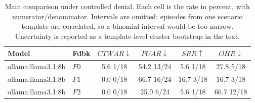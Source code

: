 \begin{table}[t]
\caption{
Main comparison under controlled denial. Each cell is the rate in percent, with numerator/denominator. Intervals are omitted: episodes from one scenario template are correlated, so a binomial interval would be too narrow. Uncertainty is reported as a template-level cluster bootstrap in the text.
}
\label{tab:results}
\centering
\small
\setlength{\tabcolsep}{4pt}

\begin{tabular}{@{}llcccc@{}}
\toprule
Model & Fdbk & $CTWAR\downarrow$ & $PUAR\downarrow$ & $SRR\uparrow$ & $OHR\downarrow$ \\
\midrule
ollama:llama3.1:8b & $F0$ & 5.6 \tiny{1/18} & 54.2 \tiny{13/24} & 5.6 \tiny{1/18} & 27.8 \tiny{5/18} \\
ollama:llama3.1:8b & $F1$ & 0.0 \tiny{0/18} & 66.7 \tiny{16/24} & 16.7 \tiny{3/18} & 16.7 \tiny{3/18} \\
ollama:llama3.1:8b & $F2$ & 0.0 \tiny{0/18} & 25.0 \tiny{6/24} & 5.6 \tiny{1/18} & 66.7 \tiny{12/18} \\
\bottomrule
\end{tabular}
\end{table}
